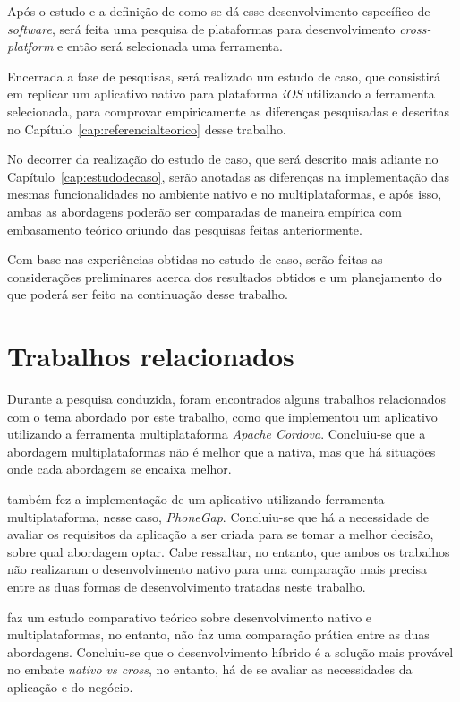 Após o estudo e a definição de como se dá esse desenvolvimento específico de \textit{software},
será feita uma pesquisa de plataformas para desenvolvimento \textit{cross-platform} e então será selecionada uma ferramenta.%

Encerrada a fase de pesquisas, será realizado um estudo de caso, que consistirá em replicar um aplicativo nativo para plataforma \textit{iOS} utilizando a ferramenta selecionada, 
para comprovar empiricamente as diferenças pesquisadas e descritas no Capítulo~\ref{cap:referencialteorico} desse trabalho.

No decorrer da realização do estudo de caso, que será descrito mais adiante no 
Capítulo~\ref{cap:estudodecaso}, serão anotadas as diferenças na implementação das mesmas funcionalidades no ambiente nativo e no multiplataformas, e após isso, ambas as abordagens poderão ser comparadas
de maneira empírica com embasamento teórico oriundo das pesquisas feitas anteriormente.

Com base nas experiências obtidas no estudo de caso, serão feitas as considerações preliminares acerca dos resultados obtidos e um planejamento do que poderá ser feito na continuação desse trabalho.

\section{Trabalhos relacionados} \label{sec:trabalhosrelacionados}

Durante a pesquisa conduzida, foram encontrados alguns trabalhos relacionados com o tema abordado por este trabalho, como 
que implementou um aplicativo utilizando a ferramenta multiplataforma \textit{Apache Cordova}. Concluiu-se que a abordagem multiplataformas 
não é melhor que a nativa, mas que há situações onde cada abordagem se encaixa melhor.

 também fez a implementação de um aplicativo utilizando ferramenta multiplataforma, nesse caso, \textit{PhoneGap}. 
Concluiu-se que há a necessidade de avaliar os requisitos da aplicação a ser criada para se tomar a melhor decisão, sobre qual abordagem optar.
Cabe ressaltar, no entanto, que ambos os trabalhos não realizaram o desenvolvimento nativo para uma comparação mais precisa entre as duas formas de desenvolvimento
tratadas neste trabalho. 

 faz um estudo comparativo teórico sobre desenvolvimento nativo e multiplataformas, no entanto,
não faz uma comparação prática entre as duas abordagens. Concluiu-se que o desenvolvimento híbrido é a solução mais provável no embate 
\textit{nativo vs cross}, no entanto, há de se avaliar as necessidades da aplicação e do negócio.

